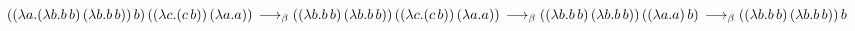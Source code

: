 \documentclass{article}
\begin{document}
$((\lambda a.(\lambda b.b\,b)\,(\lambda b.b\,b))\,b)\,((\lambda c.(c\,b))\,(\lambda a.a))\,\longrightarrow_\beta\\((\lambda b.b\,b)\,(\lambda b.b\,b))\,((\lambda c.(c\,b))\,(\lambda a.a))\,
\longrightarrow_\beta\\((\lambda b.b\,b)\,(\lambda b.b\,b))\,((\lambda a.a)\,b)\,
\longrightarrow_\beta\\((\lambda b.b\,b)\,(\lambda b.b\,b))\,b$
\end{document}
